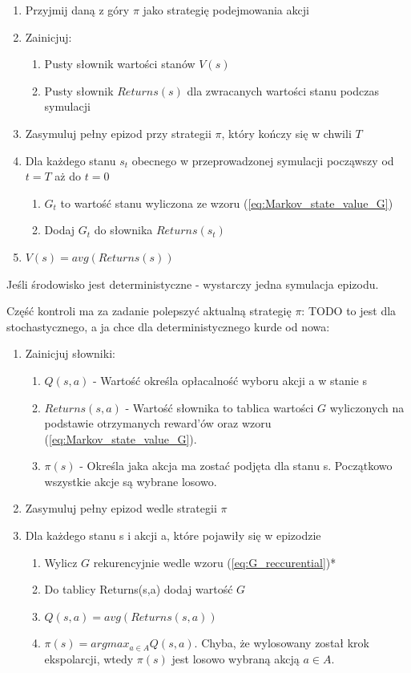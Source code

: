 \documentclass[12pt]{book}
\theoremstyle{plain}
\begin{document}
\begin{enumerate}
	\item{Przyjmij daną z góry $\pi$ jako strategię podejmowania akcji}
	\item Zainicjuj:
		\begin{enumerate}
			\item{Pusty słownik wartości stanów $V(s)$}
			\item{Pusty słownik $Returns(s)$ dla zwracanych wartości stanu podczas symulacji}
		\end{enumerate}
	\item{Zasymuluj pełny epizod przy strategii $\pi$, który kończy się w chwili $T$ }
	\item{Dla każdego stanu $s_t$ obecnego w przeprowadzonej symulacji począwszy od $t=T$ aż do $t=0$}	
		\begin{enumerate}
			\item $G_t$ to wartość stanu wyliczona ze wzoru (\ref{eq:Markov_state_value_G})
			\item Dodaj $G_t$ do słownika $Returns(s_t)$
	\end{enumerate}
	\item{$V(s)=avg(Returns(s))$}
\end{enumerate}
Jeśli środowisko jest deterministyczne - wystarczy jedna symulacja epizodu. 

Część kontroli ma za zadanie polepszyć aktualną strategię $\pi$:
TODO to jest dla stochastycznego, a ja chce dla deterministycznego kurde 
od nowa:
\begin{enumerate}
	\item Zainicjuj słowniki:
	\begin{enumerate}
		\item $Q(s,a)$ - Wartość określa opłacalność wyboru akcji a w stanie s
		\item $Returns(s,a)$ - Wartość słownika to tablica wartości $G$ wyliczonych na podstawie otrzymanych reward'ów oraz wzoru (\ref{eq:Markov_state_value_G}).
		\item $\pi(s)$ - Określa jaka akcja ma zostać podjęta dla stanu s. Początkowo wszystkie akcje są wybrane losowo.
	\end{enumerate}
	\item Zasymuluj pełny epizod wedle strategii $\pi$
	\item Dla każdego stanu s i akcji a, które pojawiły się w epizodzie
	\begin{enumerate}
		\item Wylicz $G$ rekurencyjnie wedle wzoru (\ref{eq:G_reccurential})*
		\item Do tablicy Returns(s,a) dodaj wartość $G$
		\item $Q(s,a)=avg(Returns(s,a))$
		\item $\pi(s)=argmax_{a\in{A}}Q(s,a)$. Chyba, że wylosowany został krok ekspolarcji, wtedy $\pi(s)$ jest losowo wybraną akcją $a \in A$.
	\end{enumerate}
\end{enumerate}
\end{document}
